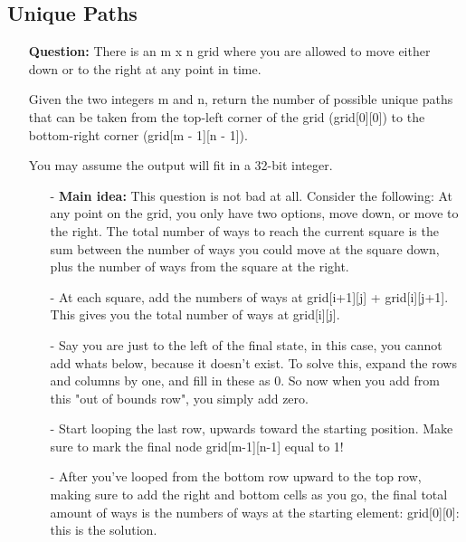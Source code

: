 \documentclass[12pt]{article}
\begin{document}
\subsection{Unique Paths}
\begin{enumerate}
  \item[] \textbf{Question:}
    There is an m x n grid where you are allowed to move either down or to the right at any point in time.

Given the two integers m and n, return the number of possible unique paths that can be taken from the top-left corner of the grid (grid[0][0]) to the bottom-right corner (grid[m - 1][n - 1]).

You may assume the output will fit in a 32-bit integer.

    \begin{enumerate}
      \item[-] \textbf{Main idea:} This question is not bad at all. Consider the following: At any point on the grid, you only have two options, move down, or move to the right. The total number of ways to reach the current square is the sum between the number of ways you could move at the square down, plus the number of ways from the square at the right.
      \item[-] At each square, add the numbers of ways at grid[i+1][j] + grid[i][j+1]. This gives you the total number of ways at grid[i][j].
      \item[-] Say you are just to the left of the final state, in this case, you cannot add whats below, because it doesn't exist. To solve this, expand the rows and columns by one, and fill in these as 0. So now when you add from this "out of bounds row", you simply add zero. 
      \item[-] Start looping the last row, upwards toward the starting position. Make sure to mark the final node grid[m-1][n-1] equal to 1!
      \item[-] After you've looped from the bottom row upward to the top row, making sure to add the right and bottom cells as you go, the final total amount of ways is the numbers of ways at the starting element: grid[0][0]: this is the solution.
    \end{enumerate}
\end{enumerate}
\end{document}
